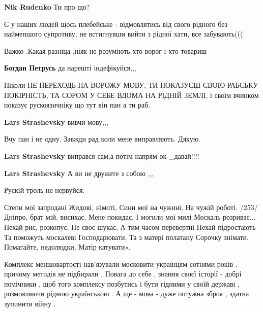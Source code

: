 \begin{itemize}
\begin{itemize}
\textbf{Nik Rudenko}
Ти про що?

\end{itemize} %


Є у наших людей щось плебейське - відмовлятись від свого рідного без найменшого
супротиву, не встигнувши вийти з рідної хати, все забувають(((


Важко .Какая разніца ,ніяк не розуміють хто ворог і хто товариш

\begin{itemize} %
\textbf{Богдан Петрусь} да нарешті індефікуйся,,,
\end{itemize} %


Ніколи НЕ ПЕРЕХОДЬ НА ВОРОЖУ МОВУ, ТИ ПОКАЗУЄШ СВОЮ РАБСЬКУ ПОКІРНІСТЬ, ТА
СОРОМ У СЕБЕ ВДОМА НА РІДНІЙ ЗЕМЛІ, і своїм вчинком показує рускоязичніку що
тут він пан а ти раб.

\begin{itemize} %
\textbf{Lars Strashevsky} вивчи мову,,,

Вчу пан і не одну. Завжди рад коли мене виправляють. Дякую.

\begin{itemize} %
\textbf{Lars Strashevsky} виправся сам,а потім напрям ок \_давай!!!!
\end{itemize} %

\textbf{Lars Strashevsky} А ви не дружете з собою ,,,

Рускій троль не нервуйся.

\end{itemize} %


\obeycr
Степи мої запродані
Жидові, німоті,
Сини мої на чужині,
На чужій роботі. /253/
Дніпро, брат мій, висихає,
Мене покидає,
І могили мої милі
Москаль розриває...
Нехай риє, розкопує,
Не своє шукає,
А тим часом перевертні
Нехай підростають
Та поможуть москалеві
Господарювати,
Та з матері полатану
Сорочку знімати.
Помагайте, недолюдки,
Матір катувати».
\restorecr


Комплекс меншовартості нав'язували московити українцям сотнями років , причому
методів не підбирали . Повага до себе , знання своєї історії - добрі помічники
, щоб того комплексу позбутись і бути гідними у своїй державі , розмовляючи
рідною українською . А ще - мова - дуже потужна зброя , здатна зупинити війну .



\end{itemize}
